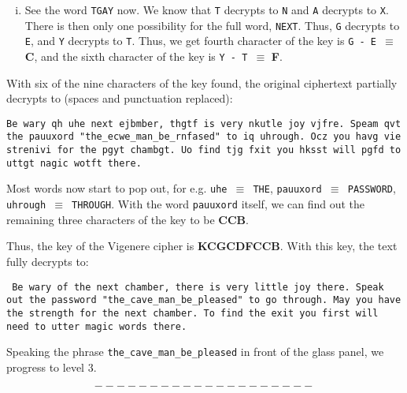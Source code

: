 \documentclass[11pt]{article}
\begin{document}
\begin{enumerate}
\begin{enumerate}[i.]
    \item See the word \texttt{TGAY} now. We know that \texttt{T} decrypts to \texttt{N} and \texttt{A} decrypts to \texttt{X}. There is then only one possibility for the full word, \texttt{NEXT}. Thus, \texttt{G} decrypts to \texttt{E}, and \texttt{Y} decrypts to \texttt{T}. Thus, we get fourth character of the key is \texttt{G - E $\equiv$} \textbf{C}, and the sixth character of the key is \texttt{Y - T $\equiv$} \textbf{F}.

  \end{enumerate}

  With six of the nine characters of the key found, the original ciphertext partially decrypts to (spaces and punctuation replaced):

  \begin{center}
    \texttt{Be wary qh uhe next ejbmber, thgtf is very nkutle joy vjfre. Speam qvt the pauuxord "the\_ecwe\_man\_be\_rnfased" to iq uhrough. Ocz you havg vie strenivi for the pgyt chambgt. Uo find tjg fxit you hksst will pgfd to uttgt nagic wotft there.}
  \end{center}

  Most words now start to pop out, for e.g. \texttt{uhe $\equiv$ THE}, \texttt{pauuxord $\equiv$ PASSWORD}, \texttt{uhrough $\equiv$ THROUGH}. With the word \texttt{pauuxord} itself, we can find out the remaining three characters of the key to be \textbf{CCB}. 
  
  Thus, the key of the Vigenere cipher is \textbf{KCGCDFCCB}. With this key, the text fully decrypts to: 

  \begin{center}
    \texttt{
      Be wary of the next chamber, there is very little joy there. Speak out the password "the\_cave\_man\_be\_pleased" to go through. May you have the strength for the next chamber. To find the exit you first will need to utter magic words there.
    }
  \end{center}
  
   Speaking the phrase \texttt{the\_cave\_man\_be\_pleased} in front of the glass panel, we progress to level 3.
\end{enumerate}

$$--------------------$$
\end{document}
